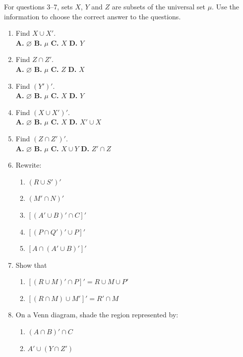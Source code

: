 \noindent For questions 3--7, sets $X$, $Y$ and $Z$ are subsets of the universal set $\mu$.
Use the information to choose the correct answer to the questions.

\begin{enumerate}[resume]
\item Find $X \cup X'$. \\
\textbf{A.} $\varnothing$ \quad \textbf{B.} $\mu$ \quad \textbf{C.} $X$ \quad \textbf{D.} $Y$

\item Find $Z \cap Z'$. \\
\textbf{A.} $\varnothing$ \quad \textbf{B.} $\mu$ \quad \textbf{C.} $Z$ \quad \textbf{D.} $X$

\item Find $(Y')'$. \\
\textbf{A.} $\varnothing$ \quad \textbf{B.} $\mu$ \quad \textbf{C.} $X$ \quad \textbf{D.} $Y$

\item Find $(X\cup X')'$. \\
\textbf{A.} $\varnothing$ \quad \textbf{B.} $\mu$ \quad \textbf{C.} $X$ \quad \textbf{D.} $X'\cup X$

\item Find $(Z\cap Z')'$. \\
\textbf{A.} $\varnothing$ \quad \textbf{B.} $\mu$ \quad \textbf{C.} $X\cup Y$ \quad \textbf{D.} $Z'\cap Z$

\item Rewrite:
\begin{enumerate}
  \item[a.] $(R\cup S')'$
  \item[b.] $(M'\cap N)'$
  \item[c.] $[(A'\cup B)'\cap C]'$
  \item[d.] $[(P\cap Q')'\cup P]'$
  \item[e.] $[A\cap(A'\cup B)']'$
\end{enumerate}

\item Show that
\begin{enumerate}
  \item[a.] $[(R\cup M)'\cap P]' = R\cup M\cup P'$
  \item[b.] $[(R\cap M)\cup M']' = R'\cap M$
\end{enumerate}

\item On a Venn diagram, shade the region represented by:
\begin{enumerate}
  \item[a.] $(A\cap B)'\cap C$
  \item[b.] $A'\cup(Y\cap Z')$
\end{enumerate}


\end{enumerate}
